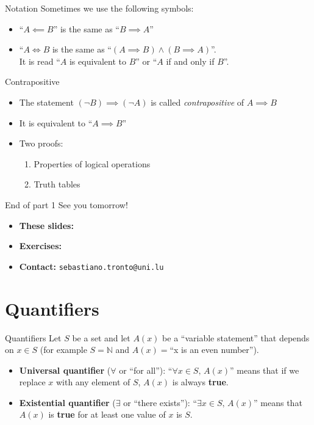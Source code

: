 \documentclass[11pt]{beamer}
\makeatletter
\theoremstyle{definition}
\newcommand{\refgithub}{
  \begin{itemize}
    \item \textbf{These slides:}
    \item \textbf{Exercises:}
    \item \textbf{Contact:} \texttt{sebastiano.tronto@uni.lu}
  \end{itemize}
}
\makeatother
\begin{document}
\begin{frame}{Notation}
  Sometimes we use the following symbols:
  \begin{itemize}
    \item ``$A\impliedby B$'' is the same as ``$B\implies A$''
    \item ``$A\iff B$ is the same as ``$(A\implies B)\land (B\implies A)$''.\\
        It is read ``$A$ is equivalent to $B$'' or ``$A$ if and only if $B$''.
  \end{itemize}
\end{frame}

\begin{frame}{Contrapositive}
  \begin{itemize}
    \item The statement $(\neg B)\implies (\neg A)$ is called
          \emph{contrapositive} of $A\implies B$
    \pause
    \item It is equivalent to ``$A\implies B$''
    \pause
    \item Two proofs:
      \begin{enumerate}
        \item Properties of logical operations
        \item Truth tables
      \end{enumerate}
  \end{itemize}
\end{frame}

\begin{frame}{End of part 1}
  See you tomorrow!

  \refgithub
\end{frame}

\section{Quantifiers}

\begin{frame}{Quantifiers}
  Let $S$ be a set and let $A(x)$ be a ``variable statement'' that depends on
  $x\in S$ (for example $S=\mathbb{N}$ and $A(x)=$``x is an even number'').
  \pause

  \begin{itemize}
    \item \textbf{Universal quantifier} ($\forall$ or ``for all''):
          ``$\forall x\in S,\,A(x)$'' means that if we replace $x$ with any
          element of $S$, $A(x)$ is always \textbf{true}.
    \item \textbf{Existential quantifier} ($\exists$ or ``there exists''):
          ``$\exists x\in S,\, A(x)$'' means that $A(x)$ is \textbf{true} for
          at least one value of $x$ is $S$.
  \end{itemize}
\end{frame}
\end{document}
